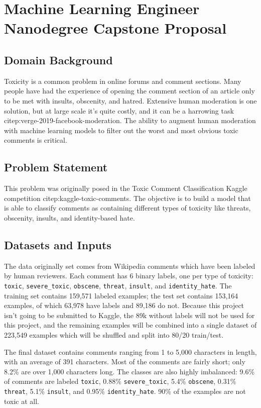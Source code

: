 \documentclass[12pt]{article}
\author{Andrew Pope}
\date{\today}
\title{}
\begin{document}
\section*{Machine Learning Engineer Nanodegree Capstone Proposal}
\label{sec:org765bff2}
\subsection*{Domain Background}
\label{sec:org5c50f4f}
Toxicity is a common problem in online forums and comment sections. Many people have had the experience of opening the comment section of an article only to be met with insults, obscenity, and hatred. Extensive human moderation is one solution, but at large scale it's quite costly, and it can be a harrowing task citep:verge-2019-facebook-moderation. The ability to augment human moderation with machine learning models to filter out the worst and most obvious toxic comments is critical.
\subsection*{Problem Statement}
\label{sec:orgfc9de37}
This problem was originally posed in the Toxic Comment Classification Kaggle competition citep:kaggle-toxic-comments. The objective is to build a model that is able to classify comments as containing different types of toxicity like threats, obscenity, insults, and identity-based hate.
\subsection*{Datasets and Inputs}
\label{sec:org20cab88}
The data originally set comes from Wikipedia comments which have been labeled by human reviewers. Each comment has 6 binary labels, one per type of toxicity: \texttt{toxic}, \texttt{severe\_toxic}, \texttt{obscene}, \texttt{threat}, \texttt{insult}, and \texttt{identity\_hate}. The training set contains 159,571 labeled examples; the test set
contains 153,164 examples, of which 63,978 have labels and 89,186 do not. Because this project isn't going to be submitted to Kaggle, the 89k without labels will not be used for this project, and the remaining examples will be combined into a single dataset of 223,549 examples which will be shuffled and split into 80/20 train/test.

The final dataset contains comments ranging from 1 to 5,000 characters in length, with an average of 391 characters. Most of the comments are fairly short; only 8.2\% are over 1,000 characters long. The classes are also highly imbalanced: 9.6\% of comments are labeled \texttt{toxic}, 0.88\% \texttt{severe\_toxic}, 5.4\% \texttt{obscene}, 0.31\% \texttt{threat}, 5.1\% \texttt{insult}, and 0.95\% \texttt{identity\_hate}. 90\% of the examples are not toxic at all.
\end{document}
